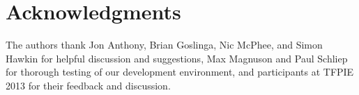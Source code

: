 \documentclass[submission,copyright,creativecommons]{eptcs}
\newcommand{\allcomments}[1]{{#1}}
\newcommand{\elenacomment}[1]{{\bf \textcolor{ForestGreen}{\allcomments{{#1}}}}}
\newcommand{\joecomment}[1]{{\bf \color{JoesGold}{\allcomments{{#1}}}}}
\begin{document}
\section{Acknowledgments}
The authors thank Jon Anthony, Brian Goslinga, Nic McPhee, and Simon Hawkin for helpful discussion and suggestions, %
Max Magnuson and Paul Schliep for thorough testing of our development environment, and participants at TFPIE 2013 for their feedback and discussion. 




\end{document}
